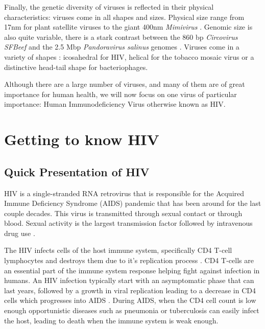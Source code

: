 \documentclass[
  11pt,
  twoside]{scrbook}
\begin{document}
Finally, the genetic diversity of viruses is reflected in their physical characteristics: viruses come in all shapes and sizes. Physical size range from 17nm for plant satellite viruses \autocite{pyleChapter58Biology2017} to the giant 400nm \emph{Mimivirus} \autocite{raoult2megabaseGenomeSequence2004}. Genomic size is also quite variable, there is a stark contrast between the 860 bp \emph{Circovirus SFBeef} and the 2.5 Mbp \emph{Pandoravirus salinus} genomes \autocite{campillo-balderasViralGenomeSize2015}. Viruses come in a variety of shapes \autocite{cannVirusStructure2015}: icosahedral for HIV, helical for the tobacco mosaic virus or a distinctive head-tail shape for bacteriophages.

Although there are a large number of viruses, and many of them are of great importance for human health, we will now focus on one virus of particular importance: Human Immunodeficiency Virus otherwise known as HIV.

\hypertarget{getting-to-know-hiv}{%
\section{Getting to know HIV}\label{getting-to-know-hiv}}

\hypertarget{quick-presentation-of-hiv}{%
\subsection{Quick Presentation of HIV}\label{quick-presentation-of-hiv}}

HIV is a single-stranded RNA retrovirus that is responsible for the Acquired Immune Deficiency Syndrome (AIDS) pandemic that has been around for the last couple decades. This virus is transmitted through sexual contact or through blood. Sexual activity is the largest transmission factor followed by intravenous drug use \autocite{hladikSettingStageHost2008,shawHIVTransmission2012}.

The HIV infects cells of the host immune system, specifically CD4 T-cell lymphocytes and destroys them due to it's replication process \autocite{weissHowDoesHIV1993}. CD4 T-cells are an essential part of the immune system response helping fight against infection in humans. An HIV infection typically start with an asymptomatic phase that can last years, followed by a growth in viral replication leading to a decrease in CD4 cells which progresses into AIDS \autocite{melhuishNaturalHistoryHIV2018}. During AIDS, when the CD4 cell count is low enough opportunistic diseases such as pneumonia or tuberculosis \autocite{murrayPulmonaryComplicationsAcquired1984} can easily infect the host, leading to death when the immune system is weak enough.
\end{document}

